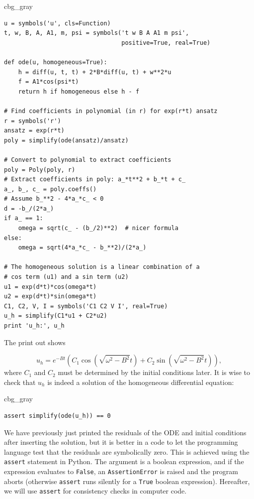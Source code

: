 \documentclass[graybox,envcountchap,sectrefs,final]{svmonodo}
\newenvironment{_cod_tight}[1]{
   \def\FrameCommand{\colorbox{#1}}
   \FrameRule0.6pt\MakeFramed {\FrameRestore}\vskip3mm}
   {\vskip0mm\endMakeFramed}
\newenvironment{cod}[1]{
\bgroup\rmfamily
\fboxsep=0mm\relax
\begin{_cod_tight}{#1}
\list{}{\parsep=-2mm\parskip=0mm\topsep=0pt\leftmargin=2mm
\rightmargin=2\leftmargin\leftmargin=4pt\relax}
\item\relax}
{\endlist\end{_cod_tight}\egroup}
\begin{document}
\begin{cod}{cbg_gray}\begin{Verbatim}[numbers=none,fontsize=\fontsize{9pt}{9pt},baselinestretch=0.95,xleftmargin=2mm]
u = symbols('u', cls=Function)
t, w, B, A, A1, m, psi = symbols('t w B A A1 m psi',
                                 positive=True, real=True)

def ode(u, homogeneous=True):
    h = diff(u, t, t) + 2*B*diff(u, t) + w**2*u
    f = A1*cos(psi*t)
    return h if homogeneous else h - f

# Find coefficients in polynomial (in r) for exp(r*t) ansatz
r = symbols('r')
ansatz = exp(r*t)
poly = simplify(ode(ansatz)/ansatz)

# Convert to polynomial to extract coefficients
poly = Poly(poly, r)
# Extract coefficients in poly: a_*t**2 + b_*t + c_
a_, b_, c_ = poly.coeffs()
# Assume b_**2 - 4*a_*c_ < 0
d = -b_/(2*a_)
if a_ == 1:
    omega = sqrt(c_ - (b_/2)**2)  # nicer formula
else:
    omega = sqrt(4*a_*c_ - b_**2)/(2*a_)

# The homogeneous solution is a linear combination of a
# cos term (u1) and a sin term (u2)
u1 = exp(d*t)*cos(omega*t)
u2 = exp(d*t)*sin(omega*t)
C1, C2, V, I = symbols('C1 C2 V I', real=True)
u_h = simplify(C1*u1 + C2*u2)
print 'u_h:', u_h
\end{Verbatim}
\end{cod}
\noindent
The print out shows

\[ u_h = e^{-Bt}\left(C_1 \cos(\sqrt{\omega^2 - B^2}t) +
C_2 \sin(\sqrt{\omega^2 - B^2}t)\right),\]
where $C_1$ and $C_2$ must be determined by the initial conditions later.
It is wise to check that $u_h$ is indeed a solution of the homogeneous
differential equation:


\begin{cod}{cbg_gray}\begin{Verbatim}[numbers=none,fontsize=\fontsize{9pt}{9pt},baselinestretch=0.95,xleftmargin=2mm]
assert simplify(ode(u_h)) == 0
\end{Verbatim}
\end{cod}
\noindent
We have previously just printed the residuals of the ODE and initial
conditions after inserting the solution, but it is better in a code to
let the programming language test that the residuals are symbolically zero.
This is achieved using the \texttt{assert} statement in Python. The argument is
a boolean expression, and if the expression evaluates to \texttt{False},
an \texttt{AssertionError} is raised and the program aborts (otherwise \texttt{assert}
runs silently for a \texttt{True} boolean expression). Hereafter, we will use
\texttt{assert} for consistency checks in computer code.
\end{document}
